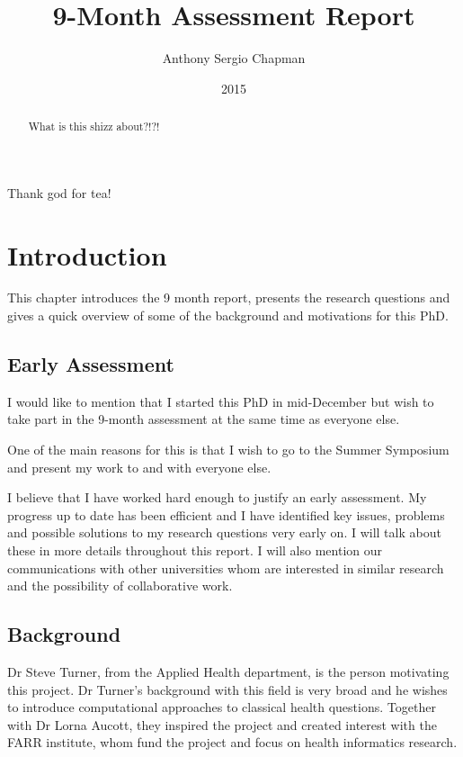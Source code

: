\documentclass[bsc]{abdnthesis}
\author{Anthony Sergio Chapman}
\title{9-Month Assessment Report}
\date{2015}
\begin{document}
\maketitle
\makedeclaration


\begin{abstract}
  What is this shizz about?!?!
\end{abstract}

\begin{acknowledgements}
  Thank god for tea!
\end{acknowledgements}

\tableofcontents


\chapter{Introduction}
This chapter introduces the 9 month report, presents the research questions and gives a quick overview of some of the background and motivations for this PhD. 

\section{Early Assessment} %
\label{sec:early_assessment}
I would like to mention that I started this PhD in mid-December but wish to take part in the 9-month assessment at the same time as everyone else. 

One of the main reasons for this is that I wish to go to the Summer Symposium and present my work to and with everyone else. 

I believe that I have worked hard enough to justify an early assessment. My progress up to date has been efficient and I have identified key issues, problems and possible solutions to my research questions very early on. I will talk about these in more details throughout this report. I will also mention our communications with other universities whom are interested in similar research and the possibility of collaborative work.
\section{Background} %
\label{sec:background}
Dr Steve Turner, from the Applied Health department, is the person motivating this project. Dr Turner's background with this field is very broad and he wishes to introduce computational approaches to classical health questions. Together with Dr Lorna Aucott, they inspired the project and created interest with the FARR institute, whom fund the project and focus on health informatics research. 
\end{document}

